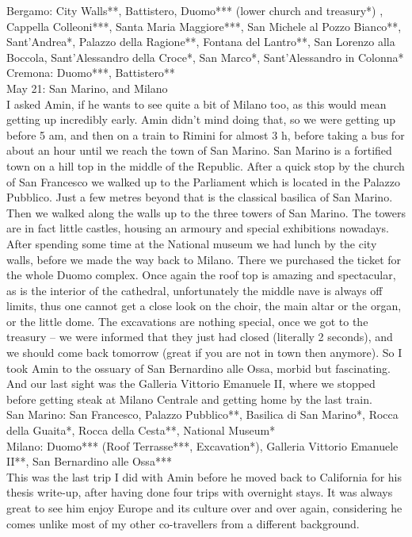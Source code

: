 Bergamo: City Walls**, Battistero, Duomo*** (lower church and treasury*) , Cappella Colleoni***, Santa Maria Maggiore***, San Michele al Pozzo Bianco**, Sant'Andrea*, Palazzo della Ragione**, Fontana del Lantro**, San Lorenzo alla Boccola, Sant'Alessandro della Croce*, San Marco*, Sant'Alessandro in Colonna*\\
Cremona: Duomo***, Battistero**\\

May 21: San Marino, and Milano\\
I asked Amin, if he wants to see quite a bit of Milano too, as this would mean getting up incredibly early. Amin didn't mind doing that, so we were getting up before 5 am, and then on a train to Rimini for almost 3 h, before taking a bus for about an hour until we reach the town of San Marino. San Marino is a fortified town on a hill top in the middle of the Republic. After a quick stop by the church of San Francesco we walked up to the Parliament which is located in the Palazzo Pubblico. Just a few metres beyond that is the classical basilica of San Marino. Then we walked along the walls up to the three towers of San Marino. The towers are in fact little castles, housing an armoury and special exhibitions nowadays. After spending some time at the National museum we had lunch by the city walls, before we made the way back to Milano. There we purchased the ticket for the whole Duomo complex. Once again the roof top is amazing and spectacular, as is the interior of the cathedral, unfortunately the middle nave is always off limits, thus one cannot get a close look on the choir, the main altar or the organ, or the little dome. The excavations are nothing special, once we got to the treasury -- we were informed that they just had closed (literally 2 seconds), and we should come back tomorrow (great if you are not in town then anymore). So I took Amin to the ossuary of San Bernardino alle Ossa, morbid but fascinating. And our last sight was the Galleria Vittorio Emanuele II, where we stopped before getting steak at Milano Centrale and getting home by the last train.\\

San Marino: San Francesco, Palazzo Pubblico**, Basilica di San Marino*, Rocca della Guaita*, Rocca della Cesta**, National Museum*\\
Milano: Duomo*** (Roof Terrasse***, Excavation*), Galleria Vittorio Emanuele II**, San Bernardino alle Ossa***\\

This was the last trip I did with Amin before he moved back to California for his thesis write-up, after having done four trips with overnight stays. It was always great to see him enjoy Europe and its culture over and over again, considering he comes unlike most of my other co-travellers from a different background.\\

